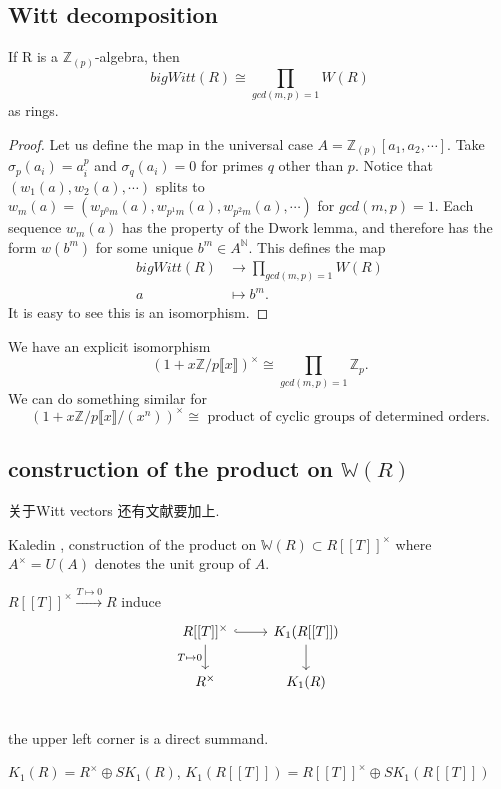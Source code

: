 \subsection{Witt decomposition}
\begin{prop}
	 If R is a $\mathbb{Z}_{(p)}$-algebra, then
	 \[bigWitt(R) \cong \prod_{gcd(m,p)=1} W(R)\]
	 as rings.

\end{prop}
\begin{proof}
	Let us define the map in the universal case $A = \mathbb{Z}_{(p)}[a_1, a_2,\cdots]$. Take $\sigma_p(a_i) = a_i^p$ and $\sigma_q(a_i) = 0$ for primes $q$ other than $p$. Notice that $(w_1(a),w_2(a),\cdots)$ splits to $w_m (a) = (w_{p^0 m}(a),w_{p^1 m}(a),w_{p^2 m}(a),\cdots)$ for $gcd(m,p) = 1$. Each sequence $w_m (a)$ has the property of the Dwork lemma, and therefore has the form $w(b^m)$ for some unique $b^m \in A^{\mathbb{N}}$. This defines the map
	\begin{align*}
	bigWitt(R) &\longrightarrow \prod_{gcd(m,p)=1} W(R)\\
	a &\mapsto {b^m}.
	\end{align*}
	It is easy to see this is an isomorphism.
\end{proof}
 We have an explicit isomorphism
 \[(1 + x\mathbb{Z}/p\llbracket x \rrbracket)^\times \cong \prod_{gcd(m,p)=1} \mathbb{Z}_p .\]
We can do something similar for
 \[(1 + x\mathbb{Z}/p\llbracket x \rrbracket/(x^n))^\times \cong \text{ product of cyclic groups of determined orders}.\]


\subsection{construction of the product on $\mathbb{W}(R)$}
关于Witt vectors 还有文献\cite{Ramachandran2015599}要加上.

Kaledin \cite{MR3024824}, construction of the product on $\mathbb{W}(R)\subset R[[T]]^{\times}$
where $A^{\times}=U(A)$ denotes the unit group of $A$.

$R[[T]]^{\times}\overset{T\mapsto 0}\longrightarrow R$ induce
\[
\begin{tikzcd}
		R[[T]]^{\times} \ar[r, hook] \ar[d,"T \mapsto 0"']& K_1(R[[T]])\ar[d]\\
		R^{\times} & K_1(R)\\
	\end{tikzcd}
\]
the upper left corner is a direct summand.

$K_1(R)=R^{\times}\oplus SK_1(R)$, $K_1(R[[T]])=R[[T]]^{\times}\oplus SK_1(R[[T]])$

